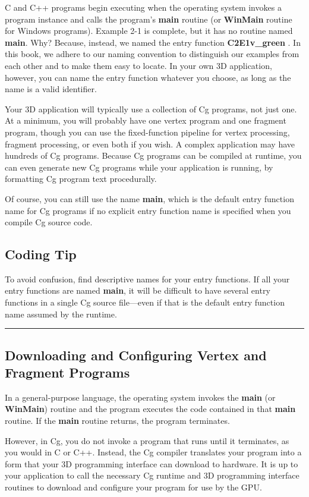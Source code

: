 \documentclass{book}
\begin{document}
C and C++ programs begin executing when the operating system invokes a program instance and calls the program's \textbf{main} routine (or \textbf{WinMain} routine for Windows programs). Example 2-1 is complete, but it has no routine named \textbf{main}. Why? Because, instead, we named the entry function \textbf{C2E1v_green} . In this book, we adhere to our naming convention to distinguish our examples from each other and to make them easy to locate. In your own 3D application, however, you can name the entry function whatever you choose, as long as the name is a valid identifier.

Your 3D application will typically use a collection of Cg programs, not just one. At a minimum, you will probably have one vertex program and one fragment program, though you can use the fixed-function pipeline for vertex processing, fragment processing, or even both if you wish. A complex application may have hundreds of Cg programs. Because Cg programs can be compiled at runtime, you can even generate new Cg programs while your application is running, by formatting Cg program text procedurally.

Of course, you can still use the name \textbf{main}, which is the default entry function name for Cg programs if no explicit entry function name is specified when you compile Cg source code.

\subsection*{Coding Tip}

To avoid confusion, find descriptive names for your entry functions. If all your entry functions are named \textbf{main}, it will be difficult to have several entry functions in a single Cg source file—even if that is the default entry function name assumed by the runtime.
\hrule

\subsection{Downloading and Configuring Vertex and Fragment Programs}

In a general-purpose language, the operating system invokes the \textbf{main} (or \textbf{WinMain}) routine and the program executes the code contained in that \textbf{main} routine. If the \textbf{main} routine returns, the program terminates.

However, in Cg, you do not invoke a program that runs until it terminates, as you would in C or C++. Instead, the Cg compiler translates your program into a form that your 3D programming interface can download to hardware. It is up to your application to call the necessary Cg runtime and 3D programming interface routines to download and configure your program for use by the GPU.
\end{document}
